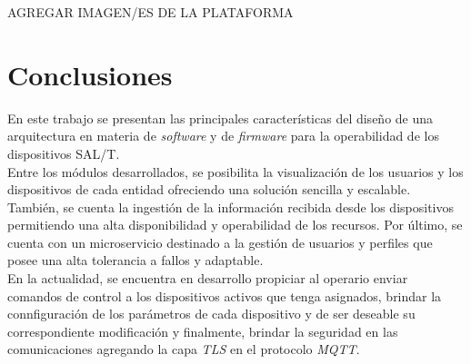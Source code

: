 \documentclass[a4paper]{IEEEtran}
\begin{document}
AGREGAR IMAGEN/ES DE LA PLATAFORMA


\section{Conclusiones}

En este trabajo se presentan las principales características del diseño de una arquitectura en materia de \textit{software} y de \textit{firmware} para la operabilidad de los dispositivos SAL/T.
\\

Entre los módulos desarrollados, se posibilita la visualización de los usuarios y los dispositivos de cada entidad ofreciendo una solución sencilla y escalable. También, se cuenta la ingestión de la información recibida desde los dispositivos permitiendo una alta disponibilidad y operabilidad de los recursos. Por último, se cuenta con un microservicio destinado a la gestión de usuarios y perfiles que posee una alta tolerancia a fallos y adaptable.
\\

En la actualidad, se encuentra en desarrollo propiciar al operario enviar comandos de control a los dispositivos activos que tenga asignados, brindar la connfiguración de los parámetros de cada dispositivo y de ser deseable su correspondiente modificación y finalmente, brindar la seguridad en las comunicaciones agregando la capa \textit{TLS} en el protocolo \textit{MQTT}. 
\end{document}
